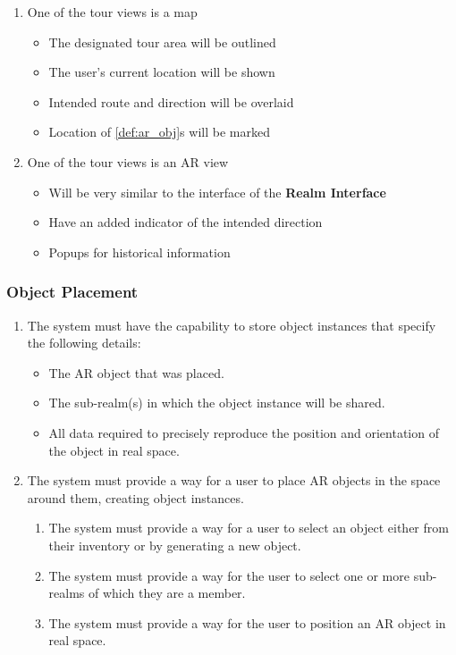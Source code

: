 \documentclass{article}
\begin{document}
\begin{enumerate}[align=left, label=\textbf{TR-FR\arabic*:}]
\begin{enumerate}[align=left, label=\textbf{TR-FR4.\arabic*:}]
        \item One of the tour views is a map
        \begin{itemize}
            \item The designated tour area will be outlined
            \item The user’s current location will be shown
            \item Intended route and direction will be overlaid
            \item Location of \ref{def:ar_obj}s will be marked
        \end{itemize}
        \item One of the tour views is an AR view
        \begin{itemize}
            \item Will be very similar to the interface of the \textbf{Realm Interface}
            \item Have an added indicator of the intended direction
            \item Popups for historical information
        \end{itemize}
    \end{enumerate}
\end{enumerate}

\subsubsection{Object Placement}
\label{ssub:object_placement}

\begin{enumerate}[align=left, label=\textbf{OP-FR\arabic*:}]
    \item The system must have the capability to store object instances that specify the following details:
    \begin{itemize}
        \item The AR object that was placed.
        \item The sub-realm(s) in which the object instance will be shared.
        \item All data required to precisely reproduce the position and orientation of the object in real space.
    \end{itemize}
    
    \item The system must provide a way for a user to place AR objects in the space around them, creating object instances.
    \begin{enumerate}[align=left, label=\textbf{OP-FR2.\arabic*:}]
        \item The system must provide a way for a user to select an object either from their inventory or by generating a new object.
        \item The system must provide a way for the user to select one or more sub-realms of which they are a member.
        \item The system must provide a way for the user to position an AR object in real space.
    \end{enumerate}
\end{enumerate}
\end{document}
